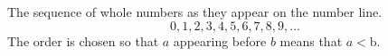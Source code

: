The sequence of whole numbers as they appear on the number line.
  \[
  0,1,2,3,4,5,6,7,8,9,\dots
  \]
  The order is chosen so that $a$ appearing before $b$ means that $a < $b.